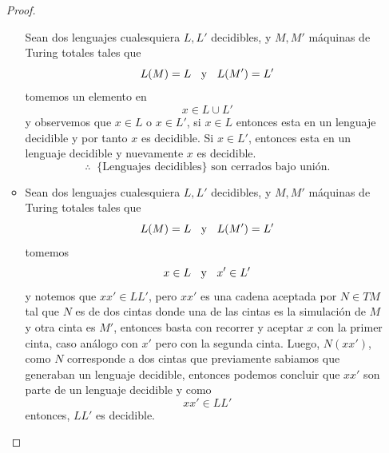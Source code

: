 \documentclass{article}
\begin{document}
\begin{enumerate}
\begin{proof}
\begin{itemize}
      Sean dos lenguajes cualesquiera $L, L'$ decidibles, y $M, M'$ máquinas de Turing totales
      tales que
      \[L(M) = L \hspace*{0.2cm}\text{ y }\hspace*{0.2cm} L(M') = L'\]
      tomemos un elemento en
      \[x \in L \cup L'\]
      y observemos que $x \in L$ o $x \in L'$, si $x \in L$ entonces esta en un lenguaje decidible y
      por tanto $x$ es decidible. Si $x \in L'$, entonces esta en un lenguaje decidible y nuevamente
      $x$ es decidible.
      \[\therefore\;\; \{\text{Lenguajes decidibles}\} \text{ son cerrados bajo unión.} \]
    \item Sean dos lenguajes cualesquiera $L, L'$ decidibles, y $M, M'$ máquinas de Turing totales
      tales que
      \[L(M) = L \hspace*{0.2cm}\text{ y }\hspace*{0.2cm} L(M') = L'\]
      tomemos
      \[x \in L \hspace*{0.2cm}\text{ y }\hspace*{0.2cm} x' \in L'\]
      y notemos que $xx' \in LL'$, pero $xx'$ es una cadena aceptada por
      $N \in TM$ tal que $N$ es de dos cintas donde una de las cintas es
      la simulación de $M$ y otra cinta es $M'$, entonces basta con recorrer
      y aceptar $x$ con la primer cinta, caso análogo con $x'$ pero con la
      segunda cinta. Luego, $N(xx')$, como $N$ corresponde a dos cintas que
      previamente sabiamos que generaban un lenguaje decidible, entonces
      podemos concluir que $xx'$ son parte de un lenguaje decidible y como
      \[xx' \in LL'\]
      entonces, $LL'$ es decidible.
    \end{itemize}
  \end{proof}
\end{enumerate}
\end{document}

